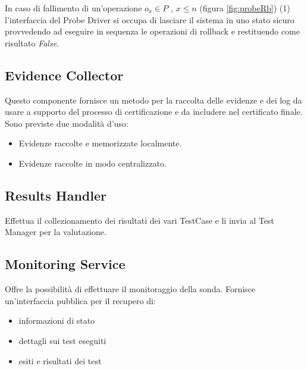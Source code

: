 \documentclass[../main.tex]{subfiles}
\begin{document}
In caso di fallimento di un'operazione $o_x \in P$ , $x \leq n$ (figura \ref{fig:probeRb}) (1) l'interfaccia del Probe Driver si occupa di lasciare il sistema in uno stato sicuro provvedendo ad eseguire in sequenza le operazioni di rollback e restituendo come risultato \textit{False}.

\subsection {Evidence Collector}
Questo componente fornisce un metodo per la raccolta delle evidenze e dei log da usare a supporto del processo di certificazione e da includere nel certificato finale.
Sono previste due modalità d'uso:
\begin{itemize}
\item Evidenze raccolte e memorizzate localmente.
\item Evidenze raccolte in modo centralizzato.
\end{itemize}

\subsection {Results Handler}
Effettua il collezionamento dei risultati dei vari TestCase e li invia al Test Manager per la valutazione.

\subsection {Monitoring Service}
Offre la possibilità di effettuare il monitoraggio della sonda. Fornisce un'interfaccia pubblica per il recupero di:
\begin{itemize}
\item informazioni di stato
\item dettagli sui test eseguiti
\item esiti e risultati dei test
\end{itemize}
\vfill
\newpage
\end{document}
